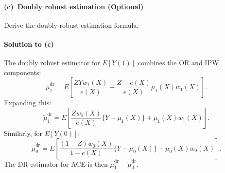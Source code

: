 \documentclass[krantz1]{krantz}
\def\Paragraph{\paragraph}
\begin{document}
 \Paragraph{(c)~Doubly robust estimation (Optional)}\label{hw::sensitivity-dr}

Derive the doubly robust estimation formula.

\Paragraph{Solution to (c)}

The doubly robust estimator for $E[Y(1)]$ combines the OR and IPW components:
\begin{equation*}
    \tilde{\mu}_1^{\mathrm{dr}} = E\left[ \frac{ZY w_1(X)}{e(X)} - \frac{Z - e(X)}{e(X)} \mu_1(X) w_1(X) \right].
\end{equation*}
Expanding this:
\begin{equation*}
    \tilde{\mu}_1^{\mathrm{dr}} = E\left[ \frac{Z w_1(X)}{e(X)} \{ Y - \mu_1(X) \} + \mu_1(X) w_1(X) \right].
\end{equation*}
Similarly, for $E[Y(0)]$:
\begin{equation*}
    \tilde{\mu}_0^{\mathrm{dr}} = E\left[ \frac{(1-Z) w_0(X)}{1 - e(X)} \{ Y - \mu_0(X) \} + \mu_0(X) w_0(X) \right].
\end{equation*}
The DR estimator for ACE is then $\tilde{\mu}_1^{\mathrm{dr}} - \tilde{\mu}_0^{\mathrm{dr}}$.
\end{document}
